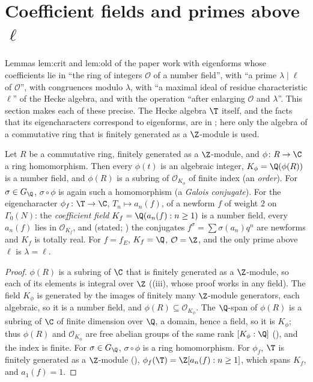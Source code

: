 \section{Coefficient fields and primes above \texorpdfstring{$\ell$}{l}}\label{sec:ant:coefficients}

Lemmas lem:crit and lem:old of the paper work with eigenforms whose coefficients lie in ``the ring of integers $\mathcal O$ of a number field'', with ``a prime
$\lambda\mid\ell$ of $\mathcal O$'', with congruences modulo $\lambda$, with ``a maximal ideal of residue characteristic $\ell$'' of the Hecke algebra, and with the
operation ``after enlarging $\mathcal O$ and $\lambda$''. This section makes each of these precise. The Hecke algebra $\T$ itself, and the facts that its
eigencharacters correspond to eigenforms, are in ; here only the algebra of a commutative ring that is finitely generated as a
$\Z$-module is used.

\begin{proposition}\label{prop:ant:coefffield}
Let $R$ be a commutative ring, finitely generated as a $\Z$-module, and $\phi\colon R\to\C$ a ring homomorphism. Then every $\phi(t)$ is an algebraic integer,
$K_\phi=\Q(\phi(R))$ is a number field, and $\phi(R)$ is a subring of $\mathcal O_{K_\phi}$ of finite index (an \emph{order}). For
$\sigma\in G_\Q$, $\sigma\circ\phi$ is again such a homomorphism (a \emph{Galois conjugate}). For the eigencharacter $\phi_f\colon\T\to\C$, $T_n\mapsto a_n(f)$, of a
newform $f$ of weight $2$ on $\Gamma_0(N)$: the \emph{coefficient field} $K_f=\Q(a_n(f):n\ge1)$ is a number field, every $a_n(f)$ lies in $\mathcal O_{K_f}$, and
(stated; ) the conjugates $f^\sigma=\sum\sigma(a_n)q^n$ are newforms and $K_f$ is totally real. For $f=f_E$, $K_f=\Q$, $\mathcal O=\Z$, and the only
prime above $\ell$ is $\lambda=\ell$.
\end{proposition}

\begin{proof}
$\phi(R)$ is a subring of $\C$ that is finitely generated as a $\Z$-module, so each of its elements is integral over $\Z$ ((iii),
whose proof works in any field). The field $K_\phi$ is generated by the images of finitely many $\Z$-module generators, each algebraic, so it is a number
field, and $\phi(R)\subseteq\mathcal O_{K_\phi}$. The $\Q$-span of $\phi(R)$ is a subring of $\C$ of finite dimension over $\Q$, a domain, hence a field, so it is $K_\phi$; thus
$\phi(R)$ and $\mathcal O_{K_\phi}$ are free abelian groups of the same rank $[K_\phi:\Q]$ (), and the index is finite. For $\sigma\in G_\Q$, $\sigma\circ\phi$ is a ring homomorphism. For $\phi_f$, $\T$ is finitely generated as a $\Z$-module
(), $\phi_f(\T)=\Z[a_n(f):n\ge1]$, which spans $K_f$, and $a_1(f)=1$.
\end{proof}

